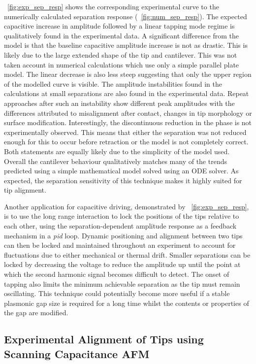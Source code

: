 \documentclass{article}
\begin{document}
\figurename~\ref{fig:exp_sep_resp} shows the corresponding experimental curve to the numerically calculated separation response (\figurename~\ref{fig:num_sep_resp}). The expected capacitive increase in amplitude followed by a linear tapping mode regime is qualitatively found in the experimental data. A significant difference from the model is that the baseline capacitive amplitude increase is not as drastic. This is likely due to the large extended shape of the tip and cantilever. This was not taken account in numerical calculations which use only a simple parallel plate model. The linear decrease is also less steep suggesting that only the upper region of the modelled curve is visible. The amplitude instabilities found in the calculations at small separations are also found in the experimental data. Repeat approaches after such an instability show different peak amplitudes with the differences attributed to misalignment after contact, changes in tip morphology or surface modification. Interestingly, the discontinuous reduction in the phase is not experimentally observed. This means that either the separation was not reduced enough for this to occur before retraction or the model is not completely correct. Both statements are equally likely due to the simplicity of the model used. Overall the cantilever behaviour qualitatively matches many of the trends predicted using a simple mathematical model solved using an ODE solver. As expected, the separation sensitivity of this technique makes it highly suited for tip alignment.

Another application for capacitive driving, demonstrated by \figurename~\ref{fig:exp_sep_resp}, is to use the long range interaction to lock the positions of the tips relative to each other, using the separation-dependent amplitude response as a feedback mechanism in a \emph{pid} loop. Dynamic positioning and alignment between two tips can then be locked and maintained throughout an experiment to account for fluctuations due to either mechanical or thermal drift. Smaller separations can be locked by decreasing the voltage to reduce the amplitude up until the point at which the second harmonic signal becomes difficult to detect. The onset of tapping also limits the minimum achievable separation as the tip must remain oscillating. This technique could potentially become more useful if a stable plasmonic gap size is required for a long time whilst the contents or properties of the gap are modified.

\FloatBarrier
\subsection{Experimental Alignment of Tips using Scanning Capacitance AFM}
\end{document}
